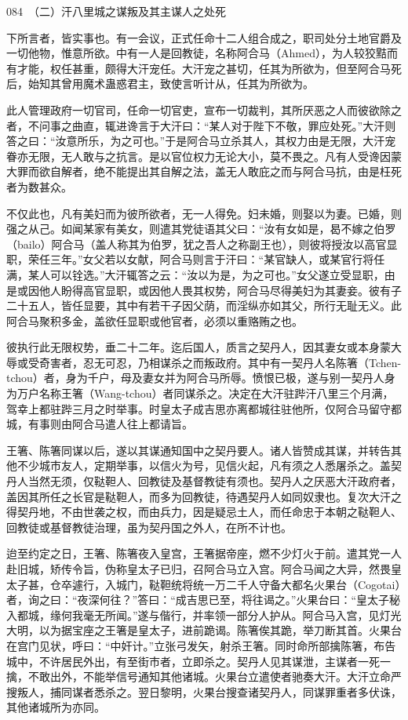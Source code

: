 \documentclass[12pt,UTF8]{ctexbook}
\begin{document}
084　（二）汗八里城之谋叛及其主谋人之处死

下所言者，皆实事也。有一会议，正式任命十二人组合成之，职司处分土地官爵及一切他物，惟意所欲。中有一人是回教徒，名称阿合马（Ahmed），为人较狡黠而有才能，权任甚重，颇得大汗宠任。大汗宠之甚切，任其为所欲为，但至阿合马死后，始知其曾用魔术蛊惑君主，致使言听计从，任其为所欲为。

此人管理政府一切官司，任命一切官吏，宣布一切裁判，其所厌恶之人而彼欲除之者，不问事之曲直，辄进谗言于大汗曰：“某人对于陛下不敬，罪应处死。”大汗则答之曰：“汝意所乐，为之可也。”于是阿合马立杀其人，其权力由是无限，大汗宠眷亦无限，无人敢与之抗言。是以官位权力无论大小，莫不畏之。凡有人受谗因蒙大罪而欲自解者，绝不能提出其自解之法，盖无人敢庇之而与阿合马抗，由是枉死者为数甚众。

不仅此也，凡有美妇而为彼所欲者，无一人得免。妇未婚，则娶以为妻。已婚，则强之从己。如闻某家有美女，则遣其党徒语其父曰：“汝有女如是，曷不嫁之伯罗（bailo）阿合马（盖人称其为伯罗，犹之吾人之称副王也），则彼将授汝以高官显职，荣任三年。”女父若以女献，阿合马则言于汗曰：“某官缺人，或某官行将任满，某人可以铨选。”大汗辄答之云：“汝以为是，为之可也。”女父遂立受显职，由是或因他人盼得高官显职，或因他人畏其权势，阿合马尽得美妇为其妻妾。彼有子二十五人，皆任显要，其中有若干子因父荫，而淫纵亦如其父，所行无耻无义。此阿合马聚积多金，盖欲任显职或他官者，必须以重赂贿之也。

彼执行此无限权势，垂二十二年。迄后国人，质言之契丹人，因其妻女或本身蒙大辱或受奇害者，忍无可忍，乃相谋杀之而叛政府。其中有一契丹人名陈箸（Tchen-tchou）者，身为千户，母及妻女并为阿合马所辱。愤恨已极，遂与别一契丹人身为万户名称王箸（Wang-tchou）者同谋杀之。决定在大汗驻跸汗八里三个月满，驾幸上都驻跸三月之时举事。时皇太子成吉思亦离都城往驻他所，仅阿合马留守都城，有事则由阿合马遣人往上都请旨。

王箸、陈箸同谋以后，遂以其谋通知国中之契丹要人。诸人皆赞成其谋，并转告其他不少城市友人，定期举事，以信火为号，见信火起，凡有须之人悉屠杀之。盖契丹人当然无须，仅鞑靼人、回教徒及基督教徒有须也。契丹人之厌恶大汗政府者，盖因其所任之长官是鞑靼人，而多为回教徒，待遇契丹人如同奴隶也。复次大汗之得契丹地，不由世袭之权，而由兵力，因是疑忌土人，而任命忠于本朝之鞑靼人、回教徒或基督教徒治理，虽为契丹国之外人，在所不计也。

迨至约定之日，王箸、陈箸夜入皇宫，王箸据帝座，燃不少灯火于前。遣其党一人赴旧城，矫传令旨，伪称皇太子已归，召阿合马立入宫。阿合马闻之大异，然畏皇太子甚，仓卒遽行，入城门，鞑靼统将统一万二千人守备大都名火果台（Cogotai）者，询之曰：“夜深何往？”答曰：“成吉思已至，将往谒之。”火果台曰：“皇太子秘入都城，缘何我毫无所闻。”遂与偕行，并率领一部分人护从。阿合马入宫，见灯光大明，以为据宝座之王箸是皇太子，进前跪谒。陈箸俟其跪，举刀断其首。火果台在宫门见状，呼曰：“中奸计。”立张弓发矢，射杀王箸。同时命所部擒陈箸，布告城中，不许居民外出，有至街市者，立即杀之。契丹人见其谋泄，主谋者一死一擒，不敢出外，不能举信号通知其他诸城。火果台立遣使者驰奏大汗。大汗立命严搜叛人，捕同谋者悉杀之。翌日黎明，火果台搜查诸契丹人，同谋罪重者多伏诛，其他诸城所为亦同。
\end{document}
